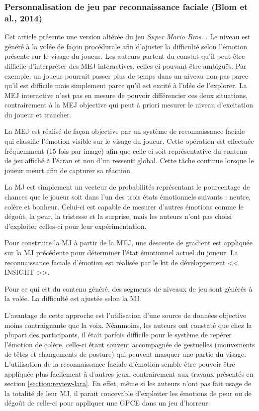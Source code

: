 \documentclass[a4paper,11pt]{article}
\begin{document}
      \subsubsection{Personnalisation de jeu par reconnaissance faciale (Blom et al., 2014)}

        Cet article présente une version altérée du jeu \textit{Super Mario Bros.} \cite{game:Mario}.
        Le niveau est généré à la volée de façon procédurale afin d'ajuster la difficulté selon l'émotion présente sur le visage du joueur.
        Les auteurs partent du constat qu'il peut être difficile d'interpréter des MEJ interactives, celles-ci pouvant être ambiguës.
        Par exemple, un joueur pourrait passer plus de temps dans un niveau non pas parce qu'il est difficile mais simplement parce qu'il est excité à l'idée de l'explorer.
        La MEJ interactive n'est pas en mesure de pouvoir différencier ces deux situations, contrairement à la MEJ objective qui peut à priori mesurer le niveau d'excitation du joueur et trancher.

        La MEJ est réalisé de façon objective par un système de reconnaissance faciale qui classifie l'émotion visible sur le visage du joueur.
        Cette opération est effectuée fréquemment (15 fois par image) afin que celle-ci soit représentative du contenu de jeu affiché à l'écran et non d'un ressenti global.
        Cette tâche continue lorsque le joueur meurt afin de capturer sa réaction.

        La MJ est simplement un vecteur de probabilités représentant le pourcentage de chances que le joueur soit dans l'un des trois états émotionnels suivants : neutre, colère et bonheur.
        Celui-ci est capable de mesurer d'autres émotions comme le dégoût, la peur, la tristesse et la surprise, mais les auteurs n'ont pas choisi d'exploiter celles-ci pour leur expérimentation.
          
        Pour construire la MJ à partir de la MEJ, une descente de gradient est appliquée sur la MJ précédente pour déterminer l'état émotionnel actuel du joueur.
        La reconnaissance faciale d'émotion est réalisée par le kit de développement << INSIGHT >>.

        Pour ce qui est du contenu généré, des segments de niveaux de jeu sont générés à la volée.
        La difficulté est ajustée selon la MJ. 

        L'avantage de cette approche est l'utilisation d'une source de données objective moins contraignante que la voix.
        Néanmoins, les auteurs ont constaté que chez la plupart des participants, il était parfois difficile pour le système de repérer l'émotion de colère, celle-ci étant souvent accompagnée de gestuelles (mouvements de têtes et changements de posture) qui peuvent masquer une partie du visage.
        L'utilisation de la reconnaissance faciale d'émotion semble être pouvoir être appliquée plus facilement à d'autres jeux, contrairement aux travaux présentés en section \ref{section:review-lara}.
        En effet, même si les auteurs n'ont pas fait usage de la totalité de leur MJ, il parait concevable d'exploiter les émotions de peur ou de dégoût de celle-ci pour appliquer une GPCE dans un jeu d'horreur.
\end{document}
